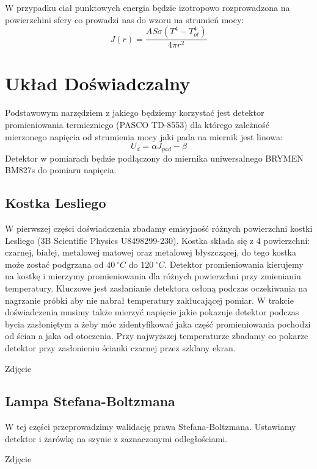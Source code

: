 \documentclass[12pt]{article}
\begin{document}
W przypadku ciał punktowych energia będzie izotropowo rozprowadzona na powierzchini sfery co prowadzi nas do wzoru na strumień mocy:
\begin{equation}
    J(r) = \frac{AS \sigma (T^4-T^4_{ot})}{4\pi r^2}
    \label{eq:power_flux}
\end{equation}

\section{Układ Doświadczalny}
Podstawowym narzędziem z jakiego będziemy korzystać jest detektor promieniowania termiczniego (PASCO TD-8553) dla którego zależność mierzonego napięcia od strumienia mocy jaki pada na miernik jest linowa:
\begin{equation}
    U_d = \alpha J_{pad}-\beta
    \label{eq:measurment_device}
\end{equation}
Detektor w pomiarach będzie podłączony do miernika uniwersalnego BRYMEN BM827s do pomiaru napięcia.
\subsection{Kostka Lesliego}
W pierwszej części doświadczenia zbadamy emisyjność różnych powierzchni kostki Lesliego (3B Scientific Physics U8498299-230). 
Kostka składa się z 4 powierzchni: czarnej, białej, metalowej matowej oraz metalowej błyszczącej, do tego kostka może zostać podgrzana od $40 \ ^{\circ}C$ do $120 \ ^{\circ}C$.
Detektor promieniowania kierujemy na kostkę i mierzymy promieniowania dla różnych powierzchni przy zmienianiu temperatury. 
Kluczowe jest zasłanianie detektora osłoną podczas oczekiwania na nagrzanie próbki aby nie nabrał temperatury zakłucającej pomiar.
W trakcie doświadczenia musimy także mierzyć napięcie jakie pokazuje detektor podczas bycia zasłoniętym a żeby móc zidentyfikować jaka część promieniowania pochodzi od ścian a jaka od otoczenia.
Przy najwyższej temperaturze zbadamy co pokarze detektor przy zasłonieniu ścianki czarnej przez szklany ekran.

Zdjęcie

\subsection{Lampa Stefana-Boltzmana}
W tej części przeprowadzimy walidację prawa Stefana-Boltzmana. Ustawiamy detektor i żarówkę na szynie z zaznaczonymi odległościami. 

Zdjęcie
\end{document}
